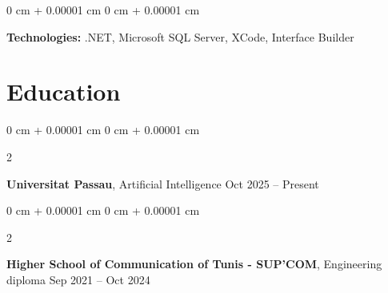 \documentclass[10pt, letterpaper]{article}
\newenvironment{onecolentry}{
    \begin{adjustwidth}{
        0 cm + 0.00001 cm
    }{
        0 cm + 0.00001 cm
    }
}{
    \end{adjustwidth}
} %
\newenvironment{twocolentry}[2][]{
    \onecolentry
    \def\secondColumn{#2}
    \setcolumnwidth{\fill, 4.5 cm}
    \begin{paracol}{2}
}{
    \switchcolumn \raggedleft \secondColumn
    \end{paracol}
    \endonecolentry
} %
\begin{document}
        \begin{onecolentry}
            \textbf{Technologies:} .NET, Microsoft SQL Server, XCode, Interface Builder
        \end{onecolentry}




    \section{Education} 
        \begin{twocolentry}{
            Oct 2025 – Present
        }
            \textbf{Universitat Passau}, Artificial Intelligence\end{twocolentry}

        \begin{twocolentry}{
            Sep 2021 – Oct 2024
        }
            \textbf{Higher School of Communication of Tunis - SUP’COM}, Engineering diploma \end{twocolentry}

    
\end{document}
